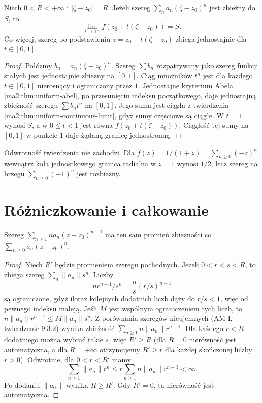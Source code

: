 \begin{twierdzenie}
\label{ma2:thm:power-abel-boundary}
Niech $0<R<+\infty$ i $|\zeta-z_0|=R$.
Jeżeli szereg $\sum_n a_n(\zeta-z_0)^n$
jest zbieżny do $S$, to
\[
 \lim_{t\to1^-}f(z_0+t(\zeta-z_0))=S.
\]
Co więcej, szereg po podstawieniu
$z=z_0+t(\zeta-z_0)$ zbiega jednostajnie
dla $t\in[0,1]$.
\end{twierdzenie}
\begin{proof}
Połóżmy $b_n=a_n(\zeta-z_0)^n$.
Szereg $\sum b_n$ rozpatrywany jako szereg
funkcji stałych jest jednostajnie zbieżny
na $[0,1]$. Ciąg mnożników $t^n$ jest
dla każdego $t\in[0,1]$ nierosnący
i ograniczony przez $1$.
Jednostajne kryterium Abela
\ref{ma2:thm:uniform-abel}, po przesunięciu
indeksu początkowego, daje jednostajną
zbieżność szeregu $\sum b_nt^n$ na $[0,1]$.
Jego suma jest ciągła z twierdzenia
\ref{ma2:thm:uniform-continuous-limit},
gdyż sumy częściowe są ciągłe.
W $t=1$ wynosi $S$, a w $0\le t<1$
jest równa $f(z_0+t(\zeta-z_0))$.
Ciągłość tej sumy na $[0,1]$ w punkcie $1$
daje żądaną granicę jednostronną.
\end{proof}
Odwrotność twierdzenia nie zachodzi.
Dla $f(z)=1/(1+z)=\sum_{n\ge0}(-z)^n$
wewnątrz koła jednostkowego granica radialna
w $z=1$ wynosi $1/2$, lecz szereg na brzegu
$\sum_{n\ge0}(-1)^n$ jest rozbieżny.

\section{Różniczkowanie i całkowanie}

\begin{twierdzenie}
\label{ma2:thm:power-derivative-radius}
Szereg
$\sum_{n\ge1}na_n(z-z_0)^{n-1}$
ma ten sam promień zbieżności co
$\sum_{n\ge0}a_n(z-z_0)^n$.
\end{twierdzenie}
\begin{proof}
Niech $R'$ będzie promieniem szeregu pochodnych.
Jeżeli $0<r<s<R$, to zbiega szereg
$\sum_n\|a_n\|s^n$. Liczby
\[
 n r^{n-1}/s^n=\frac{n}{s}(r/s)^{n-1}
\]
są ograniczone, gdyż iloraz kolejnych
dodatnich liczb dąży do $r/s<1$,
więc od pewnego indeksu maleją.
Jeśli $M$ jest wspólnym ograniczeniem tych
liczb, to $n\|a_n\|r^{n-1}\le M\|a_n\|s^n$.
Z porównania szeregów nieujemnych (AM I,
twierdzenie 9.3.2) wynika zbieżność
$\sum_{n\ge1}n\|a_n\|r^{n-1}$. Dla każdego $r<R$ dodatniego
można wybrać takie $s$, więc $R'\ge R$
(dla $R=0$ nierówność jest automatyczna,
a dla $R=+\infty$ otrzymujemy $R'\ge r$
dla każdej skończonej liczby $r>0$).
Odwrotnie, dla $0<r<R'$ mamy
\[
 \sum_{n\ge1}\|a_n\|r^n
 \le r\sum_{n\ge1}n\|a_n\|r^{n-1}<\infty.
\]
Po dodaniu $\|a_0\|$ wynika $R\ge R'$.
Gdy $R'=0$, ta nierówność jest automatyczna.
\end{proof}

